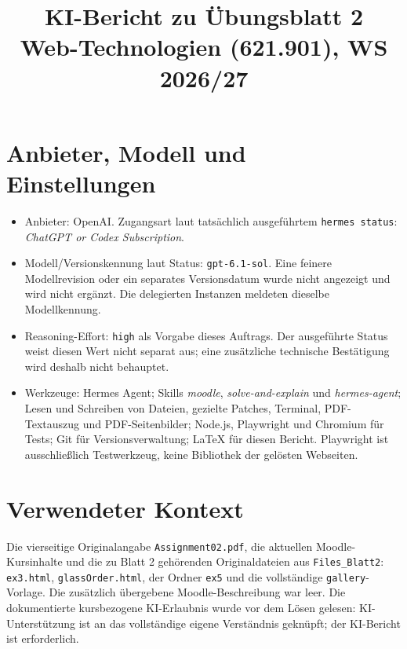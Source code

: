 \documentclass[11pt,a4paper]{article}
\title{KI-Bericht zu Übungsblatt 2\\\large Web-Technologien (621.901), WS 2026/27}
\author{}
\date{}
\begin{document}
\maketitle
\section*{Anbieter, Modell und Einstellungen}
\begin{itemize}
\item Anbieter: OpenAI. Zugangsart laut tatsächlich ausgeführtem \texttt{hermes status}: \emph{ChatGPT or Codex Subscription}.
\item Modell/Versionskennung laut Status: \texttt{gpt-6.1-sol}. Eine feinere Modellrevision oder ein separates Versionsdatum wurde nicht angezeigt und wird nicht ergänzt. Die delegierten Instanzen meldeten dieselbe Modellkennung.
\item Reasoning-Effort: \texttt{high} als Vorgabe dieses Auftrags. Der ausgeführte Status weist diesen Wert nicht separat aus; eine zusätzliche technische Bestätigung wird deshalb nicht behauptet.
\item Werkzeuge: Hermes Agent; Skills \emph{moodle}, \emph{solve-and-explain} und \emph{hermes-agent}; Lesen und Schreiben von Dateien, gezielte Patches, Terminal, PDF-Textauszug und PDF-Seitenbilder; Node.js, Playwright und Chromium für Tests; Git für Versionsverwaltung; LaTeX für diesen Bericht. Playwright ist ausschließlich Testwerkzeug, keine Bibliothek der gelösten Webseiten.
\end{itemize}

\section*{Verwendeter Kontext}
Die vierseitige Originalangabe \texttt{Assignment02.pdf}, die aktuellen Moodle-Kursinhalte und die zu Blatt 2 gehörenden Originaldateien aus \texttt{Files\_Blatt2}: \texttt{ex3.html}, \texttt{glassOrder.html}, der Ordner \texttt{ex5} und die vollständige \texttt{gallery}-Vorlage. Die zusätzlich übergebene Moodle-Beschreibung war leer. Die dokumentierte kursbezogene KI-Erlaubnis wurde vor dem Lösen gelesen: KI-Unterstützung ist an das vollständige eigene Verständnis geknüpft; der KI-Bericht ist erforderlich.
\end{document}
